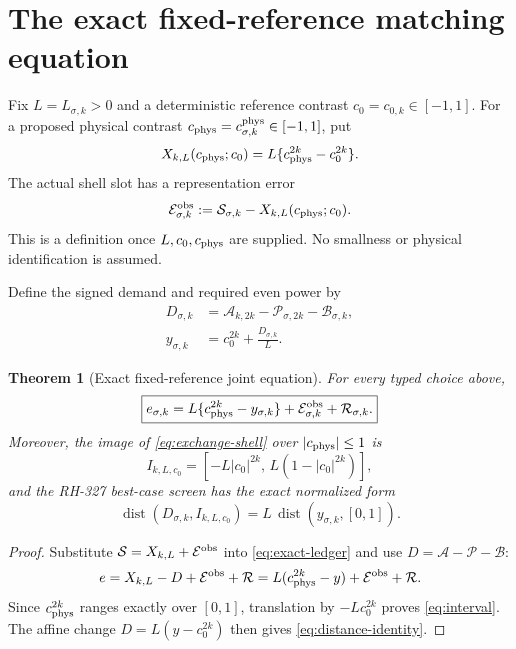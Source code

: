 \documentclass[11pt]{article}
\newtheorem{theorem}{Theorem}[section]
\theoremstyle{remark}
\newcommand{\dist}{\operatorname{dist}}
\newcommand{\cA}{\mathcal A}
\newcommand{\cB}{\mathcal B}
\newcommand{\cE}{\mathcal E}
\newcommand{\cP}{\mathcal P}
\newcommand{\cR}{\mathcal R}
\newcommand{\cS}{\mathcal S}
\begin{document}
\section{The exact fixed-reference matching equation}

Fix $L=L_{\sigma,k}>0$ and a deterministic reference contrast
$c_0=c_{0,k}\in[-1,1]$.  For a proposed physical contrast
$c_{\rm phys}=c_{\sigma,k}^{\rm phys}\in[-1,1]$, put
\begin{equation}
 X_{k,L}(c_{\rm phys};c_0)
 =L\{c_{\rm phys}^{2k}-c_0^{2k}\}.
 \label{eq:exchange-shell}
\end{equation}
The actual shell slot has a representation error
\begin{equation}
 \cE_{\sigma,k}^{\rm obs}
 :=\cS_{\sigma,k}-X_{k,L}(c_{\rm phys};c_0).
 \label{eq:observation-error}
\end{equation}
This is a definition once $L,c_0,c_{\rm phys}$ are supplied.  No smallness
or physical identification is assumed.

Define the signed demand and required even power by
\begin{align}
 D_{\sigma,k}
 &=\cA_{k,2k}-\cP_{\sigma,2k}-\cB_{\sigma,k},
 \label{eq:demand}\\
 y_{\sigma,k}
 &=c_0^{2k}+\frac{D_{\sigma,k}}{L}.
 \label{eq:required-power}
\end{align}

\begin{theorem}[Exact fixed-reference joint equation]
\label{thm:joint-equation}
For every typed choice above,
\begin{equation}
 \boxed{
 e_{\sigma,k}
 =L\{c_{\rm phys}^{2k}-y_{\sigma,k}\}
  +\cE_{\sigma,k}^{\rm obs}+\cR_{\sigma,k}.}
 \label{eq:joint-equation}
\end{equation}
Moreover, the image of \eqref{eq:exchange-shell} over
$|c_{\rm phys}|\le1$ is
\begin{equation}
 I_{k,L,c_0}
 =[-L|c_0|^{2k},\,L(1-|c_0|^{2k})],
 \label{eq:interval}
\end{equation}
and the RH-327 best-case screen has the exact normalized form
\begin{equation}
 \dist(D_{\sigma,k},I_{k,L,c_0})
 =L\,\dist(y_{\sigma,k},[0,1]).
 \label{eq:distance-identity}
\end{equation}
\end{theorem}

\begin{proof}
Substitute
$\cS=X_{k,L}+\cE^{\rm obs}$ into \eqref{eq:exact-ledger} and use
$D=\cA-\cP-\cB$:
\[
 e=X_{k,L}-D+\cE^{\rm obs}+\cR
  =L(c_{\rm phys}^{2k}-y)+\cE^{\rm obs}+\cR.
\]
Since $c_{\rm phys}^{2k}$ ranges exactly over $[0,1]$, translation by
$-Lc_0^{2k}$ proves \eqref{eq:interval}.  The affine change
$D=L(y-c_0^{2k})$ then gives \eqref{eq:distance-identity}.
\end{proof}
\end{document}

